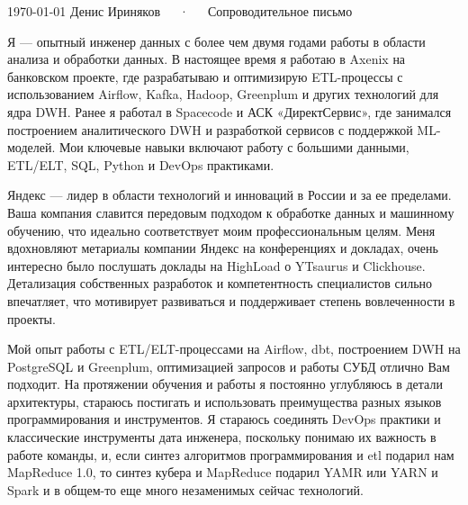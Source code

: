 \documentclass[11pt, a4paper]{../awesome-cv}
\begin{document}
\makecvheader[R]

\makecvfooter
  {\today}
  {Денис Ириняков~~~·~~~Сопроводительное письмо}
  {}

\makelettertitle

\begin{cvletter}

Я — опытный инженер данных с более чем двумя годами работы в области анализа и обработки данных. В настоящее время я работаю в Axenix на банковском проекте, где разрабатываю и оптимизирую ETL-процессы с использованием Airflow, Kafka, Hadoop, Greenplum и других технологий для ядра DWH. Ранее я работал в Spacecode и АСК «ДиректСервис», где занимался построением аналитического DWH и разработкой сервисов с поддержкой ML-моделей. Мои ключевые навыки включают работу с большими данными, ETL/ELT, SQL, Python и DevOps практиками.

Яндекс — лидер в области технологий и инноваций в России и за ее пределами. Ваша компания славится передовым подходом к обработке данных и машинному обучению, что идеально соответствует моим профессиональным целям. Меня вдохновляют метариалы компании Яндекс на конференциях и докладах, очень интересно было послушать доклады на HighLoad о YTsaurus и Clickhouse. Детализация собственных разработок и компетентность специалистов сильно впечатляет, что мотивирует развиваться и поддерживает степень вовлеченности в проекты. 

Мой опыт работы с ETL/ELT-процессами на Airflow, dbt, построением DWH на PostgreSQL и Greenplum, оптимизацией запросов и работы СУБД отлично Вам подходит. На протяжении обучения и работы я постоянно углубляюсь в детали архитектуры, стараюсь постигать и использовать преимущества разных языков программирования и инструментов. Я стараюсь соединять DevOps практики и классические инструменты дата инженера, поскольку понимаю их важность в работе команды, и, если синтез алгоритмов программирования и etl подарил нам MapReduce 1.0, то синтез кубера и MapReduce подарил YAMR или YARN и Spark и в общем-то еще много незаменимых сейчас технологий.

\end{cvletter}

\makeletterclosing
\end{document}
